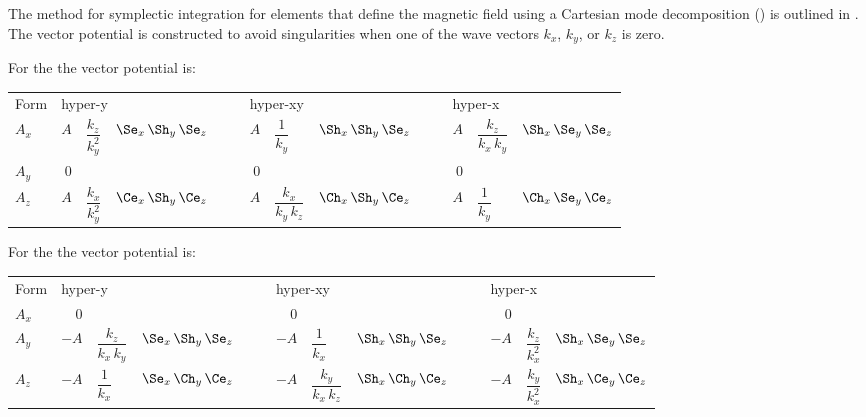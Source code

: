 The method for symplectic integration for elements that define the magnetic field using a
Cartesian mode decomposition () is outlined in .  The
vector potential is constructed to avoid singularities when one of the wave vectors $k_x$,
$k_y$, or $k_z$ is zero.

For the   the vector potential is:
\begin{center}
{
\setlength{\tabcolsep}{1pt}
\begin{tabular}{lrllrllrll}
  Form \; & \multicolumn{3}{l}{hyper-y}  & \multicolumn{3}{l}{hyper-xy}  & \multicolumn{3}{l}{hyper-x} \\
  $A_x$   & 
    $A$ & $\dfrac{k_z}{k_y^2}$      & $\Se_x \, \Sh_y \, \Se_z \qquad$ &
    $A$ & $\dfrac{1}{k_y}$          & $\Sh_x \, \Sh_y \, \Se_z \qquad$ &
    $A$ & $\dfrac{k_z}{k_x \, k_y}$ & $\Sh_x \, \Se_y \, \Se_z$ \\
  $A_y$   & 0 &&& 0 &&& 0 && \\
  $A_z$   & 
    $A$ & $\dfrac{k_x}{k_y^2}$      & $\Ce_x \, \Sh_y \, \Ce_z \qquad$ &
    $A$ & $\dfrac{k_x}{k_y \, k_z}$ & $\Ch_x \, \Sh_y \, \Ce_z \qquad$ &
    $A$ & $\dfrac{1}{k_y}$          & $\Ch_x \, \Se_y \, \Ce_z$ 
\end{tabular}
}
\end{center}

For the   the vector potential is:
\begin{center}
{
\setlength{\tabcolsep}{1pt}
\begin{tabular}{lrllrllrll}
  Form \; & \multicolumn{3}{l}{hyper-y}  & \multicolumn{3}{l}{hyper-xy}  & \multicolumn{3}{l}{hyper-x} \\
  $A_x$   & 0 &&& 0 &&& 0 && \\
  $A_y$   & 
    $-A$ & $\dfrac{k_z}{k_x \, k_y}$ & $\Se_x \, \Sh_y \, \Se_z \qquad$ &
    $-A$ & $\dfrac{1}{k_x}$          & $\Sh_x \, \Sh_y \, \Se_z \qquad$ &
    $-A$ & $\dfrac{k_z}{k_x^2}$      & $\Sh_x \, \Se_y \, \Se_z$ \\
  $A_z$   & 
    $-A$ & $\dfrac{1}{k_x}$          & $\Se_x \, \Ch_y \, \Ce_z \qquad$ &
    $-A$ & $\dfrac{k_y}{k_x \, k_z}$ & $\Sh_x \, \Ch_y \, \Ce_z \qquad$ &
    $-A$ & $\dfrac{k_y}{k_x^2}$      & $\Sh_x \, \Ce_y \, \Ce_z$ 
\end{tabular}
}
\end{center}

